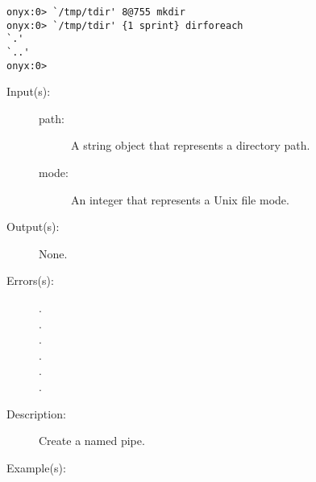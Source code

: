 \begin{description}
\begin{description}
\begin{verbatim}
onyx:0> `/tmp/tdir' 8@755 mkdir
onyx:0> `/tmp/tdir' {1 sprint} dirforeach
`.'
`..'
onyx:0>
		\end{verbatim}
	\end{description}
\label{systemdict:mkfifo}
\item[{\onyxop{path}{mkfifo}{--}}: ]
\item[{\onyxop{path mode}{mkfifo}{--}}: ]
	\begin{description}\item[]
	\item[Input(s): ]
		\begin{description}\item[]
		\item[path: ]
			A string object that represents a directory path.
		\item[mode: ]
			An integer that represents a Unix file mode.
		\end{description}
	\item[Output(s): ] None.
	\item[Errors(s): ]
		\begin{description}\item[]
		\item[.]
		\item[.]
		\item[.]
		\item[.]
		\item[.]
		\item[.]
		\end{description}
	\item[Description: ]
		Create a named pipe.
	\item[Example(s): ]\begin{verbatim}


\end{verbatim}
\end{description}
\end{description}
